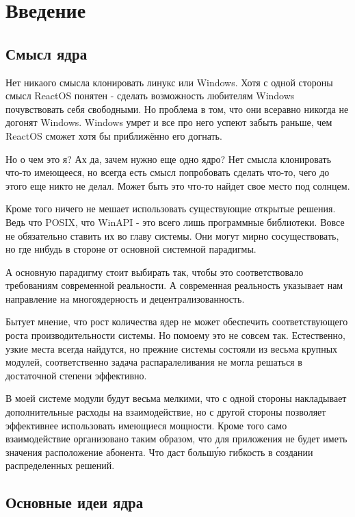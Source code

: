 \section{Введение}

\subsection{Смысл ядра}

Нет никаого смысла клонировать линукс или Windows. Хотя с одной стороны смысл
ReactOS понятен - сделать возможность любителям Windows почувствовать себя
свободными. Но проблема в том, что они всеравно никогда не догонят Windows.
Windows умрет и все про него успеют забыть раньше, чем ReactOS сможет хотя бы
приближённо его догнать.

Но о чем это я? Ах да, зачем нужно еще одно ядро? Нет смысла клонировать что-то
имеющееся, но всегда есть смысл попробовать сделать что-то, чего до этого еще
никто не делал. Может быть это что-то найдет свое место под солнцем.

Кроме того ничего не мешает использовать существующие открытые решения. Ведь что
POSIX, что WinAPI - это всего лишь программные библиотеки. Вовсе не обязательно
ставить их во главу системы. Они могут мирно сосуществовать, но где нибудь в
стороне от основной системной парадигмы.

А основную парадигму стоит выбирать так, чтобы это соответствовало требованиям
современной реальности. А современная реальность указывает нам направление на
многоядерность и децентрализованность.

Бытует мнение, что рост количества ядер не может обеспечить соответствующего
роста производительности системы. Но помоему это не совсем так. Естественно,
узкие места всегда найдутся, но прежние системы состояли из весьма крупных
модулей, соответственно задача распаралеливания не могла решаться в достаточной
степени эффективно.

В моей системе модули будут весьма мелкими, что с одной стороны накладывает
дополнительные расходы на взаимодействие, но с другой стороны позволяет
эффективнее использовать имеющиеся мощности. Кроме того само взаимодействие
организовано таким образом, что для приложения не будет иметь значения
расположение абонента. Что даст больш\'{у}ю гибкость в создании распределенных
решений.

\subsection{Основные идеи ядра}

